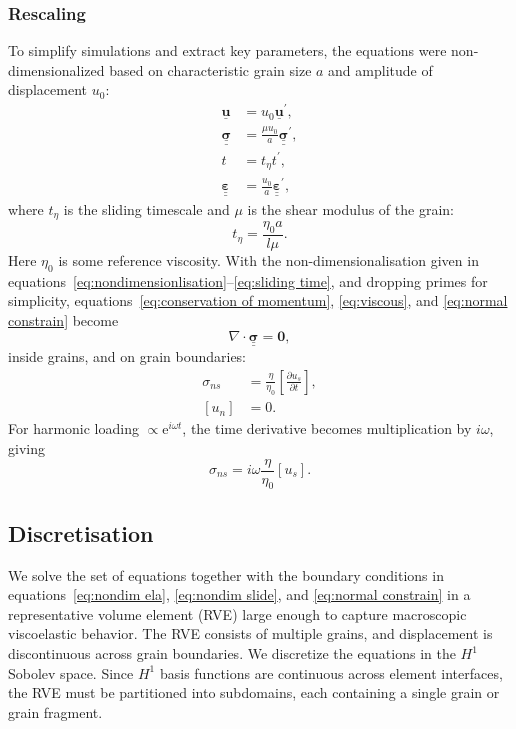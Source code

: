 \documentclass[12pt]{article}
\newcommand{\Grad}{\nabla}
\newcommand{\Div}{\Grad\cdot}
\newcommand{\pd}[2]{\frac{\partial{#1}}{\partial{#2}}}
\newcommand{\e}{\text{e}}
\newcommand{\tensor}[1]{\underline{\underline{\boldsymbol{#1}}}}
\newcommand{\vect}[1]{\underline{\boldsymbol{#1}}}
\begin{document}
\subsubsection{Rescaling}
To simplify simulations and extract key parameters, the equations were non-dimensionalized based on characteristic grain size $a$ and amplitude of displacement $u_0$:
\begin{subequations}
\begin{align}
    \vect{u} &= u_0 \vect{u}^\prime, \\
    \tensor{\sigma} &= \frac{\mu u_0}{a} \tensor{\sigma}^\prime, \\
    t &= t_\eta t^\prime, \\
    \tensor{\varepsilon} &= \frac{u_0}{a} \tensor{\varepsilon}^\prime,
\end{align}
\label{eq:nondimensionlisation}
\end{subequations}
where $t_\eta$ is the sliding timescale and $\mu$ is the shear modulus of the grain:
\begin{equation}
    t_\eta = \frac{\eta_0 a}{l \mu}. \label{eq:sliding time}
\end{equation}
Here $\eta_0$ is some reference viscosity. With the non-dimensionalisation given in equations~\ref{eq:nondimensionlisation}–\ref{eq:sliding time}, and dropping primes for simplicity, equations~\ref{eq:conservation of momentum}, \ref{eq:viscous}, and \ref{eq:normal constrain} become
\begin{equation}
    \Div \tensor{\sigma} = \boldsymbol{0}, \label{eq:nondim ela}
\end{equation}
inside grains, and on grain boundaries:
\begin{subequations}
\begin{align}
    \sigma_{ns} &=\frac{\eta}{\eta_0} \left[\pd{u_s}{t}\right], \label{eq:nondim slide}\\
    [u_n] &= 0. \label{eq:normal constrain 1}
\end{align}
\end{subequations}
For harmonic loading $\propto \e^{i\omega t}$, the time derivative becomes multiplication by $i\omega$, giving
\begin{equation}
    \sigma_{ns} = i\omega \frac{\eta}{\eta_0}[u_s]. \label{eq:laplace slide}
\end{equation}

\subsection{Discretisation}
We solve the set of equations together with the boundary conditions in equations~\ref{eq:nondim ela}, \ref{eq:nondim slide}, and \ref{eq:normal constrain} in a representative volume element (RVE) large enough to capture macroscopic viscoelastic behavior. The RVE consists of multiple grains, and displacement is discontinuous across grain boundaries. We discretize the equations in the $H^1$ Sobolev space. Since $H^1$ basis functions are continuous across element interfaces, the RVE must be partitioned into subdomains, each containing a single grain or grain fragment.
\end{document}
